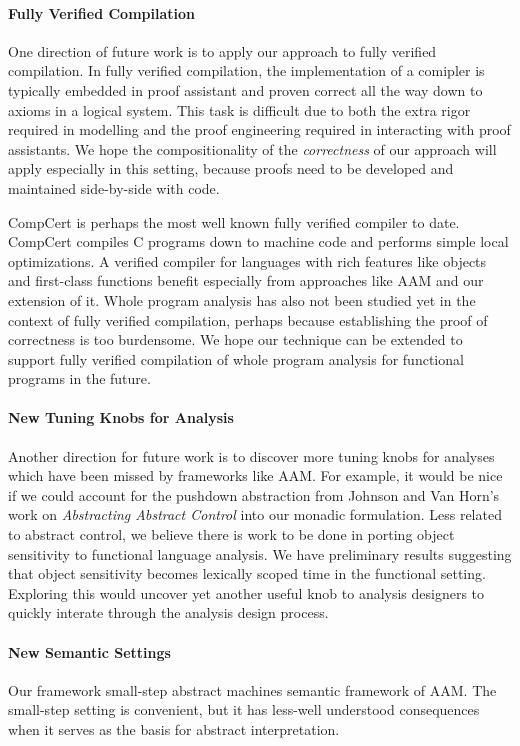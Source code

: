\documentclass{article}
\begin{document}
\paragraph{Fully Verified Compilation}
One direction of future work is to apply our approach to fully verified compilation.
In fully verified compilation, the implementation of a comipler is typically embedded in proof assistant and proven correct all the way down to axioms in a logical system.
This task is difficult due to both the extra rigor required in modelling and the proof engineering required in interacting with proof assistants.
We hope the compositionality of the \emph{correctness} of our approach will apply especially in this setting, because proofs need to be developed and maintained side-by-side with code.

CompCert\cite{CompCert} is perhaps the most well known fully verified compiler to date.
CompCert compiles C programs down to machine code and performs simple local optimizations.
A verified compiler for languages with rich features like objects and first-class functions benefit especially from approaches like AAM and our extension of it.
Whole program analysis has also not been studied yet in the context of fully verified compilation, perhaps because establishing the proof of correctness is too burdensome.
We hope our technique can be extended to support fully verified compilation of whole program analysis for functional programs in the future.

\paragraph{New Tuning Knobs for Analysis}
Another direction for future work is to discover more tuning knobs for analyses which have been missed by frameworks like AAM.
For example, it would be nice if we could account for the pushdown abstraction from Johnson and Van Horn's work on \emph{Abstracting Abstract Control} into our monadic formulation.
Less related to abstract control, we believe there is work to be done in porting object sensitivity to functional language analysis.
We have preliminary results suggesting that object sensitivity becomes lexically scoped time in the functional setting.
Exploring this would uncover yet another useful knob to analysis designers to quickly interate through the analysis design process.

\paragraph{New Semantic Settings}
Our framework small-step abstract machines semantic framework of AAM.
The small-step setting is convenient, but it has less-well understood consequences when it serves as the basis for abstract interpretation.
\end{document}
